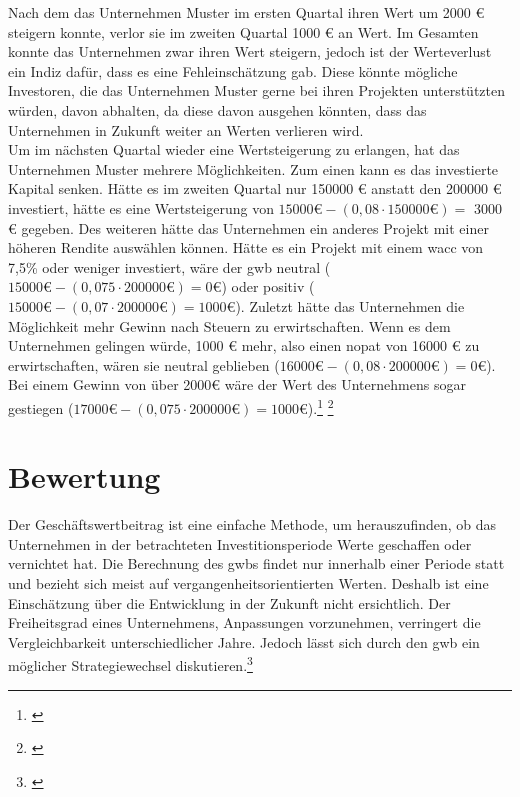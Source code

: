 Nach dem das Unternehmen Muster im ersten Quartal ihren Wert um 2000 € steigern konnte, verlor sie im zweiten Quartal 1000 € an Wert. Im Gesamten konnte das Unternehmen zwar ihren Wert steigern, jedoch ist der Werteverlust ein Indiz dafür, dass es eine Fehleinschätzung gab. Diese könnte mögliche Investoren, die das Unternehmen Muster gerne bei ihren Projekten unterstützten würden, davon abhalten, da diese davon ausgehen könnten, dass das Unternehmen in Zukunft weiter an Werten verlieren wird.\\
Um im nächsten Quartal wieder eine Wertsteigerung zu erlangen, hat das Unternehmen Muster mehrere Möglichkeiten. Zum einen kann es das investierte Kapital senken. Hätte es im zweiten Quartal nur 150000 € anstatt den 200000 € investiert, hätte es eine Wertsteigerung von $15000 \text{€} - (0,08 \cdot 150000 \text{€}) =$ 3000 € gegeben. Des weiteren hätte das Unternehmen ein anderes Projekt mit einer höheren Rendite auswählen können. Hätte es ein Projekt mit einem \ac{wacc} von 7,5\% oder weniger investiert, wäre der \ac{gwb} neutral ($15000 \text{€} - (0,075 \cdot 200000 \text{€}) = 0 \text{€}$) oder positiv ($15000 \text{€} - (0,07 \cdot 200000 \text{€}) = 1000 \text{€}$). Zuletzt hätte das Unternehmen die Möglichkeit mehr Gewinn nach Steuern zu erwirtschaften. Wenn es dem Unternehmen gelingen würde, 1000 € mehr, also einen \ac{nopat} von 16000 € zu erwirtschaften, wären sie neutral geblieben ($16000 \text{€} - (0,08 \cdot 200000 \text{€}) = 0 \text{€}$). Bei einem Gewinn von über 2000€ wäre der Wert des Unternehmens sogar gestiegen ($17000 \text{€} - (0,075 \cdot 200000 \text{€}) = 1000 \text{€}$).\footnote{\cite{studyflix-eva}} \footnote{\cite{controlling-eva}}

\section{Bewertung}

Der Geschäftswertbeitrag ist eine einfache Methode, um herauszufinden, ob das Unternehmen in der betrachteten Investitionsperiode Werte geschaffen oder vernichtet hat. Die Berechnung des \ac{gwb}s findet nur innerhalb einer Periode statt und bezieht sich meist auf vergangenheitsorientierten Werten. Deshalb ist eine Einschätzung über die Entwicklung in der Zukunft nicht ersichtlich. Der Freiheitsgrad eines Unternehmens, Anpassungen vorzunehmen, verringert die Vergleichbarkeit unterschiedlicher Jahre. Jedoch lässt sich durch den \ac{gwb} ein möglicher Strategiewechsel diskutieren.\footnote{\cite{controlling-eva}}
